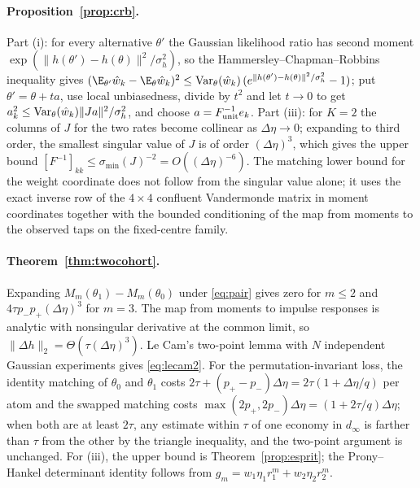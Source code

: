 \paragraph{Proposition~\ref{prop:crb}.} Part (i): for every alternative $\theta'$ the Gaussian likelihood ratio has second moment $\exp(\|h(\theta')-h(\theta)\|^2/\sigma_h^2)$, so the Hammersley--Chapman--Robbins inequality gives $(\E_{\theta'}\hat w_k-\E_\theta\hat w_k)^2\le{\rm Var}_\theta(\hat w_k)\,(e^{\|h(\theta')-h(\theta)\|^2/\sigma_h^2}-1)$; put $\theta'=\theta+ta$, use local unbiasedness, divide by $t^2$ and let $t\to0$ to get $a_k^2\le{\rm Var}_\theta(\hat w_k)\|Ja\|^2/\sigma_h^2$, and choose $a=F_{\rm unit}^{-1}e_k$. Part (iii): for $K=2$ the columns of $J$ for the two rates become collinear as $\Delta\eta\to0$; expanding to third order, the smallest singular value of $J$ is of order $(\Delta\eta)^3$, which gives the upper bound $[F^{-1}]_{kk}\le\sigma_{\min}(J)^{-2}=O((\Delta\eta)^{-6})$. The matching lower bound for the weight coordinate does not follow from the singular value alone; it uses the exact inverse row of the $4\times4$ confluent Vandermonde matrix in moment coordinates together with the bounded conditioning of the map from moments to the observed taps on the fixed-centre family.

\paragraph{Theorem~\ref{thm:twocohort}.} Expanding $M_m(\theta_1)-M_m(\theta_0)$ under \eqref{eq:pair} gives zero for $m\le2$ and $4\tau p_-p_+(\Delta\eta)^3$ for $m=3$. The map from moments to impulse responses is analytic with nonsingular derivative at the common limit, so $\|\Delta h\|_2=\Theta(\tau(\Delta\eta)^3)$. Le Cam's two-point lemma with $N$ independent Gaussian experiments gives \eqref{eq:lecam2}. For the permutation-invariant loss, the identity matching of $\theta_0$ and $\theta_1$ costs $2\tau+(p_+-p_-)\Delta\eta=2\tau(1+\Delta\eta/q)$ per atom and the swapped matching costs $\max(2p_+,2p_-)\Delta\eta=(1+2\tau/q)\Delta\eta$; when both are at least $2\tau$, any estimate within $\tau$ of one economy in $d_\infty$ is farther than $\tau$ from the other by the triangle inequality, and the two-point argument is unchanged. For (iii), the upper bound is Theorem~\ref{prop:esprit}; the Prony--Hankel determinant identity follows from $g_m=w_1\eta_1r_1^m+w_2\eta_2r_2^m$.

